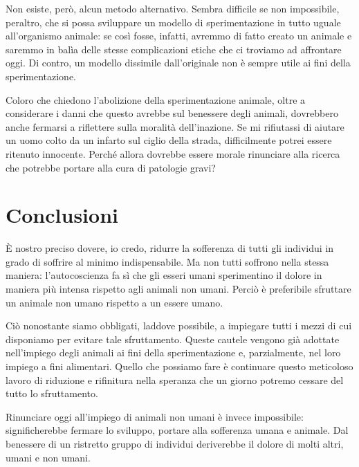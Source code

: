 \documentclass[a4paper,11pt,oneside,article]{memoir}
\begin{document}
Non esiste, però, alcun metodo alternativo. Sembra difficile se non impossibile,
peraltro, che si possa sviluppare un modello di sperimentazione in tutto uguale
all'organismo animale: se così fosse, infatti, avremmo di fatto creato un
animale e saremmo in balìa delle stesse complicazioni etiche che ci troviamo ad
affrontare oggi. Di contro, un modello dissimile dall'originale non è sempre
utile ai fini della sperimentazione.

Coloro che chiedono l'abolizione della sperimentazione animale, oltre a
considerare i danni che questo avrebbe sul benessere degli animali, dovrebbero
anche fermarsi a riflettere sulla moralità dell'inazione. Se mi rifiutassi di
aiutare un uomo colto da un infarto sul ciglio della strada, difficilmente
potrei essere ritenuto innocente. Perché allora dovrebbe essere morale
rinunciare alla ricerca che potrebbe portare alla cura di patologie gravi?

\chapter{Conclusioni}

È nostro preciso dovere, io credo, ridurre la sofferenza di tutti gli individui
in grado di soffrire al minimo indispensabile. Ma non tutti soffrono nella
stessa maniera: l'autocoscienza fa sì che gli esseri umani sperimentino il
dolore in maniera più intensa rispetto agli animali non umani. Perciò è
preferibile sfruttare un animale non umano rispetto a un essere umano.

Ciò nonostante siamo obbligati, laddove possibile, a impiegare tutti i mezzi di
cui disponiamo per evitare tale sfruttamento. Queste cautele vengono già
adottate nell'impiego degli animali ai fini della sperimentazione e,
parzialmente, nel loro impiego a fini alimentari. Quello che possiamo fare è
continuare questo meticoloso lavoro di riduzione e rifinitura nella speranza che
un giorno potremo cessare del tutto lo sfruttamento.

Rinunciare oggi all'impiego di animali non umani è invece impossibile:
significherebbe fermare lo sviluppo, portare alla sofferenza umana e animale.
Dal benessere di un ristretto gruppo di individui deriverebbe il dolore di molti
altri, umani e non umani.
\end{document}
